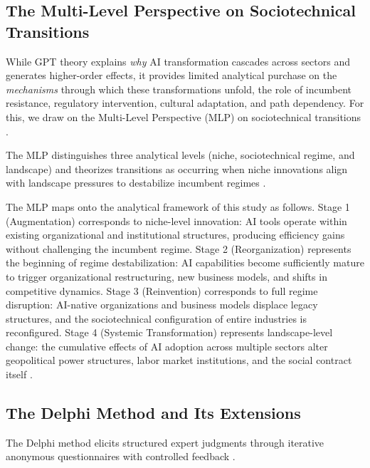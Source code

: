 \documentclass[preprint,review,12pt]{elsarticle}
\begin{document}
\subsection{The Multi-Level Perspective on Sociotechnical Transitions}
\label{sec:mlp}

While GPT theory explains \textit{why} AI transformation cascades across sectors and generates higher-order effects, it provides limited analytical purchase on the \textit{mechanisms} through which these transformations unfold, the role of incumbent resistance, regulatory intervention, cultural adaptation, and path dependency. For this, we draw on the Multi-Level Perspective (MLP) on sociotechnical transitions \citep{geels2005coevolutionary, geels2011multilevel, geels2020microfoundations}.

The MLP distinguishes three analytical levels (niche, sociotechnical regime, and landscape) and theorizes transitions as occurring when niche innovations align with landscape pressures to destabilize incumbent regimes \citep{geels2011multilevel, roberts2019accelerated}.

The MLP maps onto the analytical framework of this study as follows. Stage 1 (Augmentation) corresponds to niche-level innovation: AI tools operate within existing organizational and institutional structures, producing efficiency gains without challenging the incumbent regime. Stage 2 (Reorganization) represents the beginning of regime destabilization: AI capabilities become sufficiently mature to trigger organizational restructuring, new business models, and shifts in competitive dynamics. Stage 3 (Reinvention) corresponds to full regime disruption: AI-native organizations and business models displace legacy structures, and the sociotechnical configuration of entire industries is reconfigured. Stage 4 (Systemic Transformation) represents landscape-level change: the cumulative effects of AI adoption across multiple sectors alter geopolitical power structures, labor market institutions, and the social contract itself \citep{geels2020microfoundations, geels2020scenarios, walrave2018mlp}.


\subsection{The Delphi Method and Its Extensions}
\label{sec:delphi_method}

The Delphi method elicits structured expert judgments through iterative anonymous questionnaires with controlled feedback \citep{gordon2006rtdelphi}.
\end{document}
